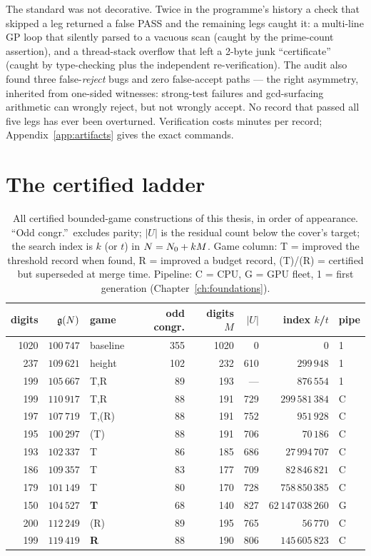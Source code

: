 The standard was not decorative. Twice in the programme's history a
check that skipped a leg returned a false PASS and the remaining legs
caught it: a multi-line GP loop that silently parsed to a vacuous scan
(caught by the prime-count assertion), and a thread-stack overflow that
left a 2-byte junk ``certificate'' (caught by type-checking plus the
independent re-verification). The audit also found three
false-\emph{reject} bugs and zero false-accept paths --- the right
asymmetry, inherited from one-sided witnesses: strong-test failures and
gcd-surfacing arithmetic can wrongly reject, but not wrongly accept. No
record that passed all five legs has ever been overturned. Verification
costs minutes per record; Appendix~\ref{app:artifacts} gives the exact
commands.


\section{The certified ladder}\label{sec:ladder}

\begin{table}[t]
\centering\small
\caption{All certified bounded-game constructions of this thesis, in
order of appearance. ``Odd congr.''\ excludes parity; $|U|$ is the
residual count below the cover's target; the search index is $k$ (or
$t$) in $N=N_0+kM$. Game column: T = improved the threshold record
when found, R = improved a budget record, (T)/(R) = certified but
superseded at merge time. Pipeline: C = CPU, G = GPU fleet,
1 = first generation (Chapter~\ref{ch:foundations}).}\label{tab:catalog}
\begin{tabular}{rrlrrrrl}
\toprule
digits & $\mathfrak{g}(N)$ & game & odd congr. & digits $M$ & $|U|$ & index $k$/$t$ & pipe\\
\midrule
1020 & $100\,747$ & baseline & 355 & 1020 & 0 & 0 & 1\\
237 & $109\,621$ & height & 102 & 232 & 610 & $299\,948$ & 1\\
199 & $105\,667$ & T,R & 89 & 193 & --- & $876\,554$ & 1\\
\midrule
199 & $110\,917$ & T,R & 88 & 191 & 729 & $299\,581\,384$ & C\\
197 & $107\,719$ & T,(R) & 88 & 191 & 752 & $951\,928$ & C\\
195 & $100\,297$ & (T) & 88 & 191 & 706 & $70\,186$ & C\\
193 & $102\,337$ & T & 86 & 185 & 686 & $27\,994\,707$ & C\\
186 & $109\,357$ & T & 83 & 177 & 709 & $82\,846\,821$ & C\\
179 & $101\,149$ & T & 80 & 170 & 728 & $758\,850\,385$ & C\\
150 & $104\,527$ & \textbf{T} & 68 & 140 & 827 & $62\,147\,038\,260$ & G\\
\midrule
200 & $112\,249$ & (R) & 89 & 195 & 765 & $56\,770$ & C\\
199 & $119\,419$ & \textbf{R} & 88 & 190 & 806 & $145\,605\,823$ & C\\
\bottomrule
\end{tabular}
\end{table}

